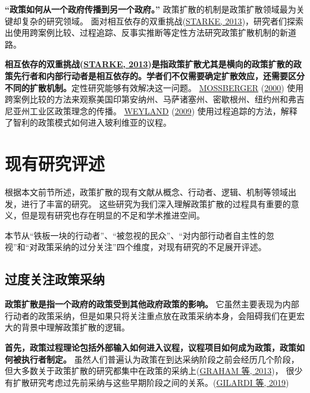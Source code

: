 \documentclass[
  12pt,
]{ctexart}
\begin{document}
\textbf{``政策如何从一个政府传播到另一个政府。''}
政策扩散的机制是政策扩散领域最为关键却复杂的研究领域。
面对相互依存的双重挑战(\protect\hyperlink{ref-Starke2013}{STARKE, 2013})，研究者们探索出使用跨案例比较、过程追踪、反事实推断等定性方法研究政策扩散机制的新道路。

\textbf{相互依存的双重挑战(\protect\hyperlink{ref-Starke2013}{STARKE, 2013})是指政策扩散尤其是横向的政策扩散的政策先行者和内部行动者是相互依存的。学者们不仅需要确定扩散效应，还需要区分不同的扩散机制。}定性研究能够有效解决这一问题。
\protect\hyperlink{ref-Mossberger2000}{MOSSBERGER} (\protect\hyperlink{ref-Mossberger2000}{2000}) 使用跨案例比较的方法来观察美国印第安纳州、马萨诸塞州、密歇根州、纽约州和弗吉尼亚州工业区政策理念的传播。
\protect\hyperlink{ref-Weyland2009}{WEYLAND} (\protect\hyperlink{ref-Weyland2009}{2009}) 使用过程追踪的方法，解释了智利的政策模式如何进入玻利维亚的议程。

\newpage

\hypertarget{ux73b0ux6709ux7814ux7a76ux8bc4ux8ff0}{%
\section{现有研究评述}\label{ux73b0ux6709ux7814ux7a76ux8bc4ux8ff0}}

根据本文前节所述，政策扩散的现有文献从概念、行动者、逻辑、机制等领域出发，进行了丰富的研究。
这些研究为我们深入理解政策扩散的过程具有重要的意义，但是现有研究也存在明显的不足和学术推进空间。

本节从``铁板一块的行动者''、``被忽视的民众''、``对内部行动者自主性的忽视''和``对政策采纳的过分关注''四个维度，对现有研究的不足展开评述。

\hypertarget{ux8fc7ux5ea6ux5173ux6ce8ux653fux7b56ux91c7ux7eb3}{%
\subsection{过度关注政策采纳}\label{ux8fc7ux5ea6ux5173ux6ce8ux653fux7b56ux91c7ux7eb3}}

\textbf{政策扩散是指一个政府的政策受到其他政府政策的影响。}
它虽然主要表现为内部行动者的政策采纳，但是如果只将关注重点放在政策采纳本身，会阻碍我们在更宏大的背景中理解政策扩散的逻辑。

\textbf{首先，政策过程理论包括外部输入如何进入议程，议程项目如何成为政策，政策如何被执行者制定。}
虽然人们普遍认为政策在到达采纳阶段之前会经历几个阶段，
但大多数关于政策扩散的研究都集中在政策的采纳上(\protect\hyperlink{ref-GrahamEtAl2013}{GRAHAM 等, 2013})，
很少有扩散研究考虑过先前采纳与这些早期阶段之间的关系。(\protect\hyperlink{ref-GilardiWasserfallen2019}{GILARDI 等, 2019})
\end{document}
